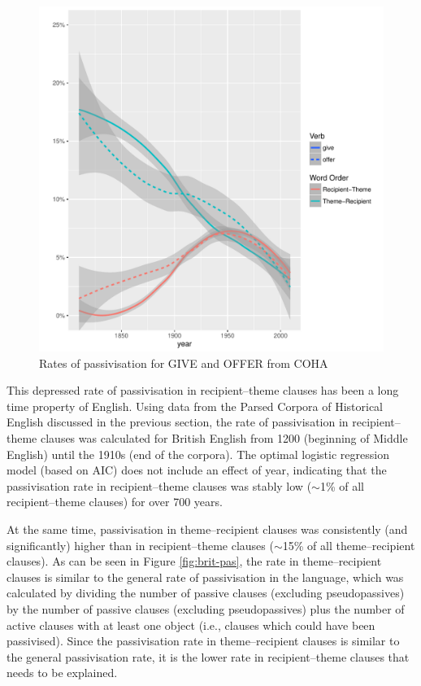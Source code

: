 	\begin{figure}[ht!]
		\includegraphics[width=\linewidth]{../images/am-change-pass}
		\caption{Rates of passivisation for GIVE and OFFER from COHA}
		\label{fig:am-change-pass}
	\end{figure}

	This depressed rate of passivisation in recipient--theme clauses has been a long time property of English. Using data from the Parsed Corpora of Historical English discussed in the previous section, the rate of passivisation in recipient--theme clauses was calculated for British English from 1200 (beginning of Middle English) until the 1910s (end of the corpora). The optimal logistic regression model (based on AIC) does not include an effect of year, indicating that the passivisation rate in recipient--theme clauses was stably low ($\sim$1\% of all recipient--theme clauses) for over 700 years. 

	At the same time, passivisation in theme--recipient clauses was consistently (and significantly) higher than in recipient--theme clauses ($\sim$15\% of all theme--recipient clauses). As can be seen in Figure \ref{fig:brit-pas}, the rate in theme--recipient clauses is similar to the general rate of passivisation in the language, which was calculated by dividing the number of passive clauses (excluding pseudopassives) by the number of passive clauses (excluding pseudopassives) plus the number of active clauses with at least one object (i.e., clauses which could have been passivised). Since the passivisation rate in theme--recipient clauses is similar to the general passivisation rate, it is the lower rate in recipient--theme clauses that needs to be explained.

